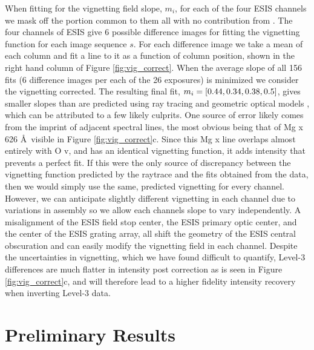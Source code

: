         When fitting for the vignetting field slope, $m_i$, for each  of the four ESIS channels we mask off the portion common to them all with no contribution from \mgxbright.
        The four channels of ESIS give 6 possible difference images for fitting the vignetting function for each image sequence $s$. 
        For each difference image we take a mean of each column and fit a line to it as a function of column position, shown in the right hand column of Figure \ref{fig:vig_correct}.
        When the average slope of all 156 fits (6 difference images per each of the 26 exposures) is minimized we consider the vignetting corrected. 
        The resulting final fit, $m_i = [0.44, 0.34, 0.38, 0.5]$, gives smaller slopes than are predicted using ray tracing and geometric optical models \citep{ESIS}, which can be attributed to a few likely culprits.
        One source of error likely comes from the imprint of adjacent spectral lines, the most obvious being that of Mg {\sc x} 626 \AA \ visible in Figure \ref{fig:vig_correct}c.
        Since this Mg {\sc x} line overlaps almost entirely with O {\sc v}, and has an identical vignetting function, it adds intensity that prevents a perfect fit. 
        If this were the only source of discrepancy between the vignetting function predicted by the raytrace and the fits obtained from the data, then we would simply use the same, predicted vignetting for every channel. 
        However, we can anticipate slightly different vignetting in each channel due to variations in assembly so we allow each channels slope to vary independently.
        A misalignment of the ESIS field stop center, the ESIS primary optic center, and the center of the ESIS grating array, all shift the geometry of the ESIS central obscuration and can easily modify the vignetting field in each channel.
        Despite the uncertainties in vignetting, which we have found difficult to quantify, Level-3 differences are much flatter in intensity post correction as is seen in Figure \ref{fig:vig_correct}c, and will therefore lead to a higher fidelity intensity recovery when inverting Level-3 data.
        

  

\section{Preliminary Results}
	
	
